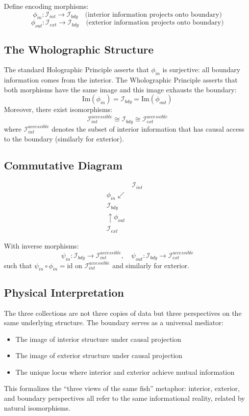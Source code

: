 ﻿\documentclass[12pt]{article}
\begin{document}
Define encoding morphisms:
\[
\phi_{in}: \mathcal{I}_{int} \to \mathcal{I}_{bdy} \quad \text{(interior information projects onto boundary)}
\]
\[
\phi_{out}: \mathcal{I}_{ext} \to \mathcal{I}_{bdy} \quad \text{(exterior information projects onto boundary)}
\]


\subsection*{The Wholographic Structure}
The standard Holographic Principle asserts that $\phi_{in}$ is surjective: all boundary information comes from the interior.  
The Wholographic Principle asserts that both morphisms have the same image and this image exhausts the boundary:
\[
\text{Im}(\phi_{in}) = \mathcal{I}_{bdy} = \text{Im}(\phi_{out})
\]
Moreover, there exist isomorphisms:
\[
\mathcal{I}_{int}^{accessible} \cong \mathcal{I}_{bdy} \cong \mathcal{I}_{ext}^{accessible}
\]
where $\mathcal{I}_{int}^{accessible}$ denotes the subset of interior information that has causal access to the boundary (similarly for exterior).


\subsection*{Commutative Diagram}
\[
\begin{array}{ccc}
& \mathcal{I}_{int} & \\
\phi_{in} \swarrow & & \\
\mathcal{I}_{bdy} & \\
\uparrow \phi_{out} & & \\
\mathcal{I}_{ext} & 
\end{array}
\]


With inverse morphisms:
\[
\psi_{in}: \mathcal{I}_{bdy} \to \mathcal{I}_{int}^{accessible}, \quad
\psi_{out}: \mathcal{I}_{bdy} \to \mathcal{I}_{ext}^{accessible}
\]
such that $\psi_{in} \circ \phi_{in} = \text{id}$ on $\mathcal{I}_{int}^{accessible}$ and similarly for exterior.


\subsection*{Physical Interpretation}
The three collections are not three copies of data but three perspectives on the same underlying structure. The boundary serves as a universal mediator:
\begin{itemize}
    \item The image of interior structure under causal projection
    \item The image of exterior structure under causal projection
    \item The unique locus where interior and exterior achieve mutual information
\end{itemize}
This formalizes the ``three views of the same fish'' metaphor: interior, exterior, and boundary perspectives all refer to the same informational reality, related by natural isomorphisms.
\end{document}
